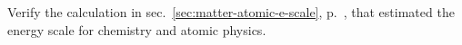 Verify the calculation in sec.~\ref{sec:matter-atomic-e-scale}, p.~\pageref{sec:matter-atomic-e-scale},
that estimated the energy scale for chemistry and atomic physics.
